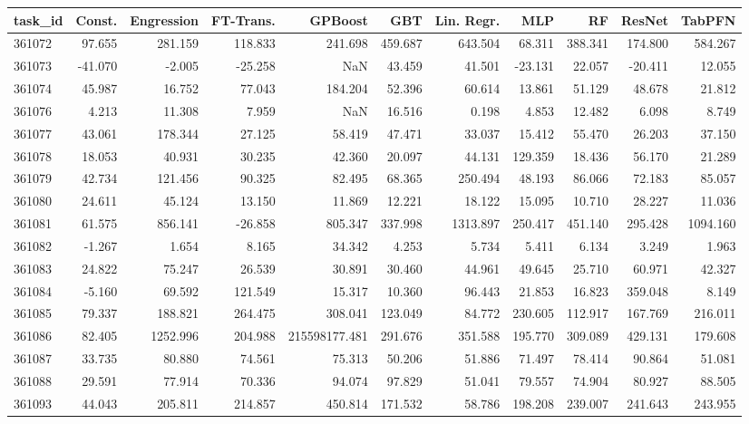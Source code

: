 \begin{tabular}{lrrrrrrrrrr}
\toprule
task\_id & Const. & Engression & FT-Trans. & GPBoost & GBT & Lin. Regr. & MLP & RF & ResNet & TabPFN \\
\midrule
361072 & 97.655 & 281.159 & 118.833 & 241.698 & 459.687 & 643.504 & 68.311 & 388.341 & 174.800 & 584.267 \\
361073 & -41.070 & -2.005 & -25.258 & NaN & 43.459 & 41.501 & -23.131 & 22.057 & -20.411 & 12.055 \\
361074 & 45.987 & 16.752 & 77.043 & 184.204 & 52.396 & 60.614 & 13.861 & 51.129 & 48.678 & 21.812 \\
361076 & 4.213 & 11.308 & 7.959 & NaN & 16.516 & 0.198 & 4.853 & 12.482 & 6.098 & 8.749 \\
361077 & 43.061 & 178.344 & 27.125 & 58.419 & 47.471 & 33.037 & 15.412 & 55.470 & 26.203 & 37.150 \\
361078 & 18.053 & 40.931 & 30.235 & 42.360 & 20.097 & 44.131 & 129.359 & 18.436 & 56.170 & 21.289 \\
361079 & 42.734 & 121.456 & 90.325 & 82.495 & 68.365 & 250.494 & 48.193 & 86.066 & 72.183 & 85.057 \\
361080 & 24.611 & 45.124 & 13.150 & 11.869 & 12.221 & 18.122 & 15.095 & 10.710 & 28.227 & 11.036 \\
361081 & 61.575 & 856.141 & -26.858 & 805.347 & 337.998 & 1313.897 & 250.417 & 451.140 & 295.428 & 1094.160 \\
361082 & -1.267 & 1.654 & 8.165 & 34.342 & 4.253 & 5.734 & 5.411 & 6.134 & 3.249 & 1.963 \\
361083 & 24.822 & 75.247 & 26.539 & 30.891 & 30.460 & 44.961 & 49.645 & 25.710 & 60.971 & 42.327 \\
361084 & -5.160 & 69.592 & 121.549 & 15.317 & 10.360 & 96.443 & 21.853 & 16.823 & 359.048 & 8.149 \\
361085 & 79.337 & 188.821 & 264.475 & 308.041 & 123.049 & 84.772 & 230.605 & 112.917 & 167.769 & 216.011 \\
361086 & 82.405 & 1252.996 & 204.988 & 215598177.481 & 291.676 & 351.588 & 195.770 & 309.089 & 429.131 & 179.608 \\
361087 & 33.735 & 80.880 & 74.561 & 75.313 & 50.206 & 51.886 & 71.497 & 78.414 & 90.864 & 51.081 \\
361088 & 29.591 & 77.914 & 70.336 & 94.074 & 97.829 & 51.041 & 79.557 & 74.904 & 80.927 & 88.505 \\
361093 & 44.043 & 205.811 & 214.857 & 450.814 & 171.532 & 58.786 & 198.208 & 239.007 & 241.643 & 243.955 \\

\end{tabular}
